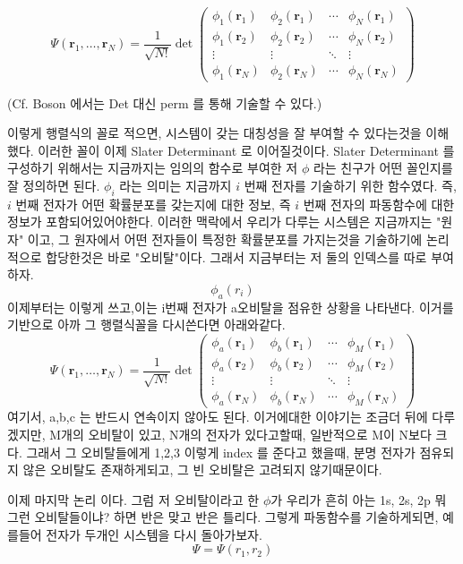 \documentclass[10pt]{article}
\begin{document}
\[
\Psi(\mathbf{r}_1, \dots, \mathbf{r}_N) 
= \frac{1}{\sqrt{N!}} \det \begin{pmatrix}
\phi_1(\mathbf{r}_1) & \phi_2(\mathbf{r}_1) & \cdots & \phi_N(\mathbf{r}_1) \\
\phi_1(\mathbf{r}_2) & \phi_2(\mathbf{r}_2) & \cdots & \phi_N(\mathbf{r}_2) \\
\vdots & \vdots & \ddots & \vdots \\
\phi_1(\mathbf{r}_N) & \phi_2(\mathbf{r}_N) & \cdots & \phi_N(\mathbf{r}_N)
\end{pmatrix}
\]
\begin{center}
(Cf. Boson 에서는 Det 대신 perm 를 통해 기술할 수 있다.)
\end{center}

이렇게 행렬식의 꼴로 적으면, 시스템이 갖는 대칭성을 잘 부여할 수 있다는것을 이해했다. 이러한 꼴이 이제 Slater Determinant 로 이어질것이다. 
Slater Determinant 를 구성하기 위해서는 지금까지는 임의의 함수로 부여한 저 \(\phi\) 라는 친구가 어떤 꼴인지를 잘 정의하면 된다. 
\(\phi_i\) 라는 의미는 지금까지 \(i\) 번째 전자를 기술하기 위한 함수였다. 즉, \(i\) 번째 전자가 어떤 확률분포를 갖는지에 대한 정보, 즉 \(i\) 번째 전자의 파동함수에 대한 정보가 포함되어있어야한다. 
이러한 맥락에서 우리가 다루는 시스템은 지금까지는 "원자" 이고, 그 원자에서 어떤 전자들이 특정한 확률분포를 가지는것을 기술하기에 논리적으로 합당한것은 바로 "오비탈"이다. 
그래서 지금부터는 저 둘의 인덱스를 따로 부여하자. 
\[\phi_a(r_i)\]
이제부터는 이렇게 쓰고,이는 i번째 전자가 a오비탈을 점유한 상황을 나타낸다. 이거를 기반으로 아까 그 행렬식꼴을 다시쓴다면 아래와같다. 
\[
\Psi(\mathbf{r}_1, \dots, \mathbf{r}_N) 
= \frac{1}{\sqrt{N!}} \det \begin{pmatrix}
\phi_a(\mathbf{r}_1) & \phi_b(\mathbf{r}_1) & \cdots & \phi_M(\mathbf{r}_1) \\
\phi_a(\mathbf{r}_2) & \phi_b(\mathbf{r}_2) & \cdots & \phi_M(\mathbf{r}_2) \\
\vdots & \vdots & \ddots & \vdots \\
\phi_a(\mathbf{r}_N) & \phi_b(\mathbf{r}_N) & \cdots & \phi_M(\mathbf{r}_N)
\end{pmatrix}
\]
여기서, a,b,c 는 반드시 연속이지 않아도 된다. 
이거에대한 이야기는 조금더 뒤에 다루겠지만, M개의 오비탈이 있고, N개의 전자가 있다고할때, 일반적으로 M이 N보다 크다. 
그래서 그 오비탈들에게 1,2,3 이렇게 index 를 준다고 했을때, 분명 전자가 점유되지 않은 오비탈도 존재하게되고, 그 빈 오비탈은 고려되지 않기때문이다. 

이제 마지막 논리 이다. 그럼 저 오비탈이라고 한 \(\phi\)가 우리가 흔히 아는 1s, 2s, 2p 뭐 그런 오비탈들이냐? 하면 반은 맞고 반은 틀리다.
그렇게 파동함수를 기술하게되면, 예를들어 전자가 두개인 시스템을 다시 돌아가보자. 
\[
\Psi = \Psi(r_1,r_2)
\]
\end{document}
